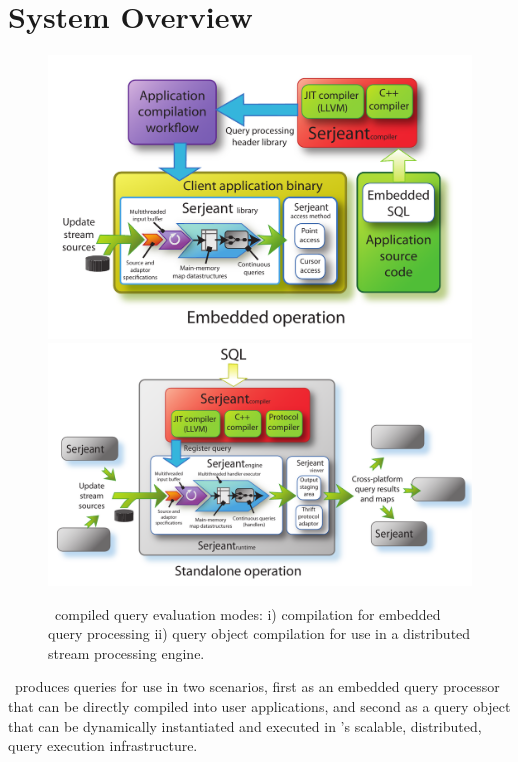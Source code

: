 \section{System Overview}

\begin{figure}[htbp]
\begin{center}
\includegraphics[scale=0.4]{figures/dbt-arch-embedded}
\includegraphics[scale=0.4]{figures/dbt-arch-standalone}
\end{center}
\caption{\compiler\ compiled query evaluation modes: i) compilation for embedded
  query processing ii) query object compilation for use in a distributed stream
  processing engine. }
\label{fig:overview}
\end{figure}

\compiler\ produces queries for use in two scenarios, first as an embedded query
processor that can be directly compiled into user applications, and second as a
query object that can be dynamically instantiated and executed in \compiler's
scalable, distributed, query execution infrastructure.

